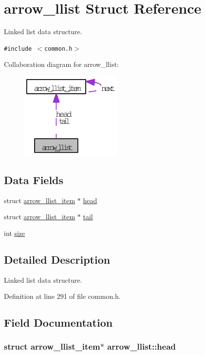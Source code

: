 \hypertarget{structarrow__llist}{
\section{arrow\_\-llist Struct Reference}
\label{structarrow__llist}
}
Linked list data structure.  


{\tt \#include $<$common.h$>$}

Collaboration diagram for arrow\_\-llist:\nopagebreak
\begin{figure}[H]
\begin{center}
\leavevmode
\includegraphics[width=144pt]{structarrow__llist__coll__graph}
\end{center}
\end{figure}
\subsection*{Data Fields}
\begin{CompactItemize}
\item 
struct \hyperlink{structarrow__llist__item}{arrow\_\-llist\_\-item} $\ast$ \hyperlink{structarrow__llist_cd27eb82097c41cb5e7ba68560073904}{head}
\item 
struct \hyperlink{structarrow__llist__item}{arrow\_\-llist\_\-item} $\ast$ \hyperlink{structarrow__llist_17aad561a27cd835fef598e8ffd135c8}{tail}
\item 
int \hyperlink{structarrow__llist_89bdc72883d1d24717445c8087b6b0dc}{size}
\end{CompactItemize}


\subsection{Detailed Description}
Linked list data structure. 

Definition at line 291 of file common.h.

\subsection{Field Documentation}
\hypertarget{structarrow__llist_cd27eb82097c41cb5e7ba68560073904}{
\subsubsection[{head}]{\setlength{\rightskip}{0pt plus 5cm}struct {\bf arrow\_\-llist\_\-item}$\ast$ {\bf arrow\_\-llist::head}}}
\label{structarrow__llist_cd27eb82097c41cb5e7ba68560073904}



